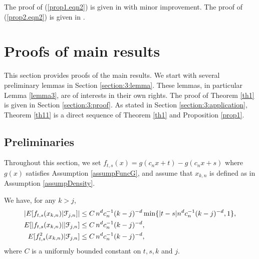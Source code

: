  The proof of (\ref{prop1.eqn2}) is given in \cite{wanglingulati2003a} with minor improvement. The proof of (\ref{prop2.eqn2}) is given in \citet[][Page 18]{csorgohorvath1993}.



\section{Proofs of main results} 

This section provides proofs of the main results. We start with several preliminary lemmas in Section \ref{section:3:lemma}.  These lemmas, in particular Lemma \ref{lemma3},  are of interests in their own rights. The proof of Theorem \ref{th1} is given in Section \ref{section:3:proof}. As stated in Section \ref{section:3:application}, Theorem \ref{th11} is a direct sequence of Theorem \ref{th1} and Proposition \ref{prop1}. 

\subsection{Preliminaries} 
Throughout this section, we set $f_{t,s}(x)=g(c_nx+t)-g(c_nx+s)$ where $g(x)$ satisfies Assumption \ref{assumpFuncG}, and assume that $x_{k,n}$ is defined as in Assumption \ref{assumpDensity}.

\begin{lem}  We have, for any $k > j$,
\begin{align}
|E[f_{t,s}(x_{k,n}) | \mathcal F_{j,n}]| &\le C\, n^{d} c_n^{-1} (k - j)^{-d} \min \{ |t - s| n^d c_n^{-1} (k - j)^{-d}, 1\}, \nonumber\\
E[|f_{t,s}(x_{k,n})| | \mathcal F_{j,n}] &\le C\, n^{d} c_n^{-1} (k - j)^{-d},  \nonumber\\
E[f^2_{t,s}(x_{k,n}) | \mathcal F_{j,n}] &\le C\, n^{d} c_n^{-1} (k - j)^{-d},
\end{align}
where $C$ is a uniformly bounded constant on $t, s, k$ and $j$.
\end{lem}

